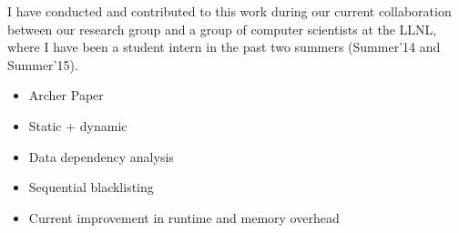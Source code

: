 I have conducted and contributed to this work during our current collaboration
between our research group and a group of computer scientists at the LLNL,
where I have been a student intern in the past two summers (Summer'14 and
Summer'15).

\begin{itemize}
\item Archer Paper
\item Static + dynamic
\item Data dependency analysis
\item Sequential blacklisting
\item Current improvement in runtime and memory overhead
\end{itemize}

